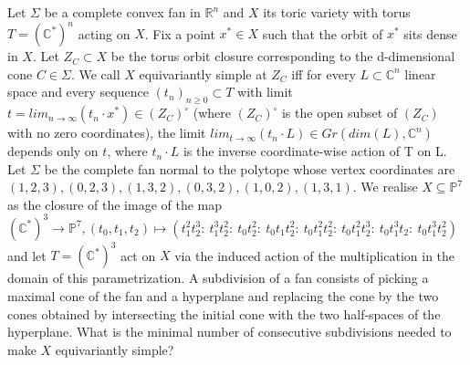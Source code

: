 Let $\Sigma$ be a complete convex fan in $\mathbb{R}^n$ and $X$ its
toric variety with torus $T = (\mathbb{C}^*)^n$ acting on $X$. Fix a point $x^*\in X$ such that the orbit of $x^*$ sits dense in $X$. Let $Z_C \subset
X$ be the torus orbit closure corresponding to the d-dimensional cone $C
\in \Sigma$. We call $X$ equivariantly simple at $Z_C$ iff for every $L
\subset \mathbb{C}^n$ linear space and every sequence $(t_n)_{n \geq 0}
\subset T$ with limit $t=lim_{n\to \infty}(t_n\cdot x^*) \in (Z_C)^{\circ}$ (where $ (Z_C)^{\circ}$ is
the open subset of $(Z_C)$ with no zero coordinates), the limit
$lim_{t\rightarrow \infty} (t_n \cdot L) \in Gr(dim(L),\mathbb{C}^n)$
depends only on $t$, where $t_n \cdot L$ is the inverse coordinate-wise
action of T on L. Let $\Sigma$ be the complete fan normal to the polytope whose vertex coordinates are $(1,2,3),(0,2,3),(1,3,2),(0,3,2),(1,0,2),(1,3,1)$. We realise $X\subseteq \mathbb{P}^7$ as the closure of the image of the map $(\mathbb{C}^*)^3\to \mathbb{P}^7, (t_0,t_1,t_2)\mapsto (t_1^2t_2^3:\:t_1^3t_2^2:\:t_0t_2^2:\:t_0t_1t_2^2:\:t_0t_1^2t_2^2:\:t_0t_1^2t_2^3:\:t_0t_1^3t_2:\:t_0t_1^3t_2^2)$ and let $T=(\mathbb{C}^*)^3$ act on $X$ via the induced action of the multiplication in the domain of this parametrization.
A subdivision of a fan consists of picking a maximal cone of the fan and a hyperplane and replacing the cone by the two cones obtained by intersecting the initial cone with the two half-spaces of the hyperplane.
 What is the minimal number of consecutive subdivisions needed to make $X$ equivariantly simple?
